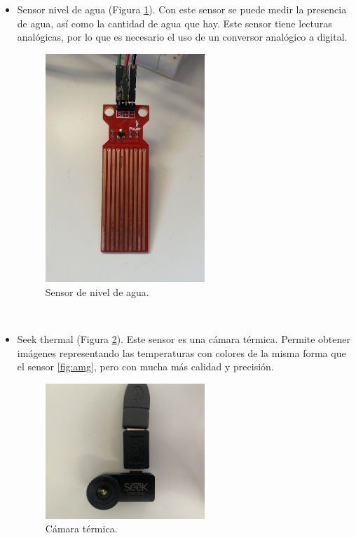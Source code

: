 \begin{itemize}
\item{Sensor nivel de agua (Figura \ref{fig:nivel}).} Con este sensor se puede medir la presencia de agua, así como la cantidad de agua que hay. Este sensor tiene lecturas analógicas, por lo que es necesario el uso de un conversor analógico a digital.
\begin{figure} [h!]
  \begin{center}
    \includegraphics[width=6cm]{figs/nivel}
  \end{center}
  \caption{Sensor de nivel de agua.}
  \label{fig:nivel}
\end{figure}\\


\item{Seek thermal (Figura \ref{fig:seek}).} Este sensor es una cámara térmica. Permite obtener imágenes representando las temperaturas con colores de la misma forma que el sensor \ref{fig:amg}, pero con mucha más calidad y precisión.\begin{figure} [h!]
  \begin{center}
    \includegraphics[width=6cm]{figs/seek}
  \end{center}
  \caption{Cámara térmica.}
  \label{fig:seek}
\end{figure}\\


\end{itemize}
